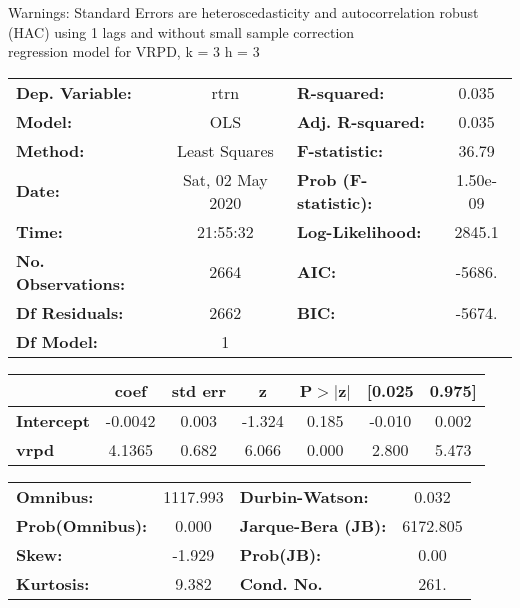 Warnings: \newline
 [1] Standard Errors are heteroscedasticity and autocorrelation robust (HAC) using 1 lags and without small sample correction\\ 

regression model for VRPD, k = 3 h = 3\begin{center}
\begin{tabular}{lclc}
\toprule
\textbf{Dep. Variable:}    &       rtrn       & \textbf{  R-squared:         } &     0.035   \\
\textbf{Model:}            &       OLS        & \textbf{  Adj. R-squared:    } &     0.035   \\
\textbf{Method:}           &  Least Squares   & \textbf{  F-statistic:       } &     36.79   \\
\textbf{Date:}             & Sat, 02 May 2020 & \textbf{  Prob (F-statistic):} &  1.50e-09   \\
\textbf{Time:}             &     21:55:32     & \textbf{  Log-Likelihood:    } &    2845.1   \\
\textbf{No. Observations:} &        2664      & \textbf{  AIC:               } &    -5686.   \\
\textbf{Df Residuals:}     &        2662      & \textbf{  BIC:               } &    -5674.   \\
\textbf{Df Model:}         &           1      & \textbf{                     } &             \\
\bottomrule
\end{tabular}
\begin{tabular}{lcccccc}
                   & \textbf{coef} & \textbf{std err} & \textbf{z} & \textbf{P$> |$z$|$} & \textbf{[0.025} & \textbf{0.975]}  \\
\midrule
\textbf{Intercept} &      -0.0042  &        0.003     &    -1.324  &         0.185        &       -0.010    &        0.002     \\
\textbf{vrpd}      &       4.1365  &        0.682     &     6.066  &         0.000        &        2.800    &        5.473     \\
\bottomrule
\end{tabular}
\begin{tabular}{lclc}
\textbf{Omnibus:}       & 1117.993 & \textbf{  Durbin-Watson:     } &    0.032  \\
\textbf{Prob(Omnibus):} &   0.000  & \textbf{  Jarque-Bera (JB):  } & 6172.805  \\
\textbf{Skew:}          &  -1.929  & \textbf{  Prob(JB):          } &     0.00  \\
\textbf{Kurtosis:}      &   9.382  & \textbf{  Cond. No.          } &     261.  \\
\bottomrule
\end{tabular}
\end{center}

